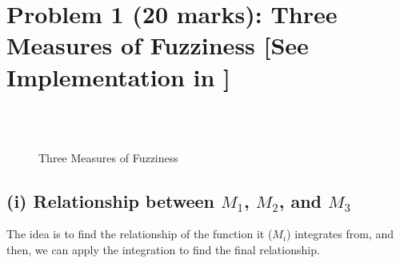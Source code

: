 \documentclass{tron}
\begin{document}
\section{Problem 1 (20 marks): Three Measures of Fuzziness [See Implementation in ]}
\begin{figure}[H]
	\centering
	 \\
	 \\
	\caption{Three Measures of Fuzziness}
	\label{fig:p1}
\end{figure}

\subsection{(i) Relationship between $M_1$, $M_2$, and $M_3$}
The idea is to find the relationship of the function it ($M_i$) integrates from, and then, we can apply the integration to find the final relationship.
\end{document}
